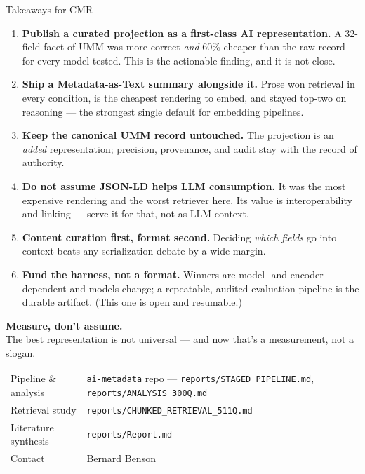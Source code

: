 \documentclass[aspectratio=169,10pt]{beamer}
\newcommand{\muted}[1]{\textcolor{inksec}{#1}}
\begin{document}
\begin{frame}{Takeaways for CMR}
  \begin{enumerate}
    \setlength{\itemsep}{0.7em}
    \item \textbf{Publish a curated projection as a first-class AI representation.}
      A 32-field facet of UMM was more correct \textit{and} 60\% cheaper than the raw record
      for every model tested. This is the actionable finding, and it is not close.
    \item \textbf{Ship a Metadata-as-Text summary alongside it.}
      Prose won retrieval in every condition, is the cheapest rendering to embed, and stayed
      top-two on reasoning --- the strongest single default for embedding pipelines.
    \item \textbf{Keep the canonical UMM record untouched.}
      The projection is an \textit{added} representation; precision, provenance, and audit
      stay with the record of authority.
    \item \textbf{Do not assume JSON-LD helps LLM consumption.}
      It was the most expensive rendering and the worst retriever here. Its value is
      interoperability and linking --- serve it for that, not as LLM context.
    \item \textbf{Content curation first, format second.}
      Deciding \textit{which fields} go into context beats any serialization debate by a wide margin.
    \item \textbf{Fund the harness, not a format.}
      Winners are model- and encoder-dependent and models change; a repeatable, audited
      evaluation pipeline is the durable artifact. \muted{(This one is open and resumable.)}
  \end{enumerate}
\end{frame}

\begin{frame}{}
  \centering
  \vspace{2em}
  {\Large\bfseries Measure, don't assume.}\\[1em]
  \muted{The best representation is not universal --- and now that's a measurement, not a slogan.}\\[3em]
  \begin{tabular}{@{}ll@{}}
    \muted{Pipeline \& analysis} & \texttt{ai-metadata} repo --- \texttt{reports/STAGED\_PIPELINE.md}, \texttt{reports/ANALYSIS\_300Q.md} \\
    \muted{Retrieval study} & \texttt{reports/CHUNKED\_RETRIEVAL\_511Q.md} \\
    \muted{Literature synthesis} & \texttt{reports/Report.md} \\
    \muted{Contact} & Bernard Benson \\
  \end{tabular}
\end{frame}
\end{document}
